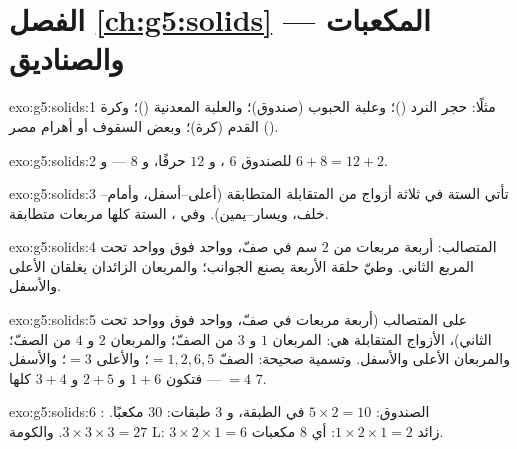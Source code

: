 \section*{الفصل \ref{ch:g5:solids} --- المكعبات والصناديق}

\begin{solution}{exo:g5:solids:1}
مثلًا: حجر النرد ()؛ وعلبة الحبوب (صندوق)؛ والعلبة المعدنية
()؛ وكرة القدم (كرة)؛ وبعض السقوف أو أهرام مصر
().
\end{solution}

\begin{solution}{exo:g5:solids:2}
للصندوق $6$ ، و $12$ حرفًا، و $8$  --- و
$6 + 8 = 12 + 2$. \checkmark
\end{solution}

\begin{solution}{exo:g5:solids:3}
تأتي  الستة في ثلاثة أزواج من  المتقابلة المتطابقة
(أعلى--أسفل، وأمام--خلف، ويسار--يمين). وفي ،  الستة
كلها مربعات متطابقة.
\end{solution}

\begin{solution}{exo:g5:solids:4}
 المتصالب: أربعة مربعات من $2$ سم في صفّ، وواحد فوق وواحد
تحت المربع الثاني. وطيّ حلقة الأربعة يصنع الجوانب؛
والمربعان الزائدان يغلقان الأعلى والأسفل.
\end{solution}

\begin{solution}{exo:g5:solids:5}
على  المتصالب (أربعة مربعات في صفّ، وواحد فوق وواحد تحت
الثاني)، الأزواج المتقابلة هي: المربعان $1$ و $3$ من الصفّ؛
والمربعان $2$ و $4$ من الصفّ؛ والمربعان الأعلى والأسفل. وتسمية
صحيحة: الصفّ $= 1, 2, 6, 5$؛ والأعلى $= 3$؛ والأسفل $= 4$
--- فتكون $1{+}6$ و $2{+}5$ و $3{+}4$ كلها $7$.
\end{solution}

\begin{solution}{exo:g5:solids:6}
الصندوق: $5 \times 2 = 10$ في الطبقة، و $3$ طبقات: $30$ مكعبًا. :
$3 \times 3 \times 3 = 27$. والكومة L: $3 \times 2 \times 1 = 6$ زائد
$1 \times 2 \times 1 = 2$: أي $8$ مكعبات.
\end{solution}

